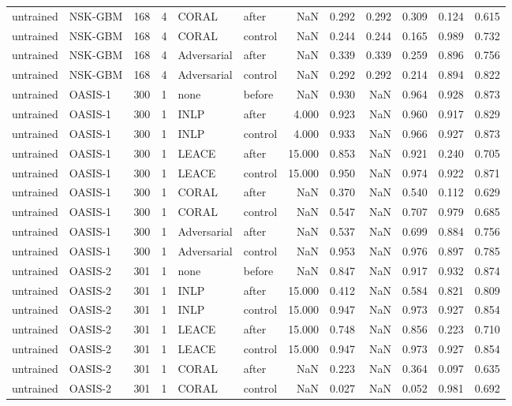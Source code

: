 \begin{tabular}{llrrllrrrrrr}
untrained & NSK-GBM & 168 & 4 & CORAL & after & NaN & 0.292 & 0.292 & 0.309 & 0.124 & 0.615 \\
untrained & NSK-GBM & 168 & 4 & CORAL & control & NaN & 0.244 & 0.244 & 0.165 & 0.989 & 0.732 \\
untrained & NSK-GBM & 168 & 4 & Adversarial & after & NaN & 0.339 & 0.339 & 0.259 & 0.896 & 0.756 \\
untrained & NSK-GBM & 168 & 4 & Adversarial & control & NaN & 0.292 & 0.292 & 0.214 & 0.894 & 0.822 \\
untrained & OASIS-1 & 300 & 1 & none & before & NaN & 0.930 & NaN & 0.964 & 0.928 & 0.873 \\
untrained & OASIS-1 & 300 & 1 & INLP & after & 4.000 & 0.923 & NaN & 0.960 & 0.917 & 0.829 \\
untrained & OASIS-1 & 300 & 1 & INLP & control & 4.000 & 0.933 & NaN & 0.966 & 0.927 & 0.873 \\
untrained & OASIS-1 & 300 & 1 & LEACE & after & 15.000 & 0.853 & NaN & 0.921 & 0.240 & 0.705 \\
untrained & OASIS-1 & 300 & 1 & LEACE & control & 15.000 & 0.950 & NaN & 0.974 & 0.922 & 0.871 \\
untrained & OASIS-1 & 300 & 1 & CORAL & after & NaN & 0.370 & NaN & 0.540 & 0.112 & 0.629 \\
untrained & OASIS-1 & 300 & 1 & CORAL & control & NaN & 0.547 & NaN & 0.707 & 0.979 & 0.685 \\
untrained & OASIS-1 & 300 & 1 & Adversarial & after & NaN & 0.537 & NaN & 0.699 & 0.884 & 0.756 \\
untrained & OASIS-1 & 300 & 1 & Adversarial & control & NaN & 0.953 & NaN & 0.976 & 0.897 & 0.785 \\
untrained & OASIS-2 & 301 & 1 & none & before & NaN & 0.847 & NaN & 0.917 & 0.932 & 0.874 \\
untrained & OASIS-2 & 301 & 1 & INLP & after & 15.000 & 0.412 & NaN & 0.584 & 0.821 & 0.809 \\
untrained & OASIS-2 & 301 & 1 & INLP & control & 15.000 & 0.947 & NaN & 0.973 & 0.927 & 0.854 \\
untrained & OASIS-2 & 301 & 1 & LEACE & after & 15.000 & 0.748 & NaN & 0.856 & 0.223 & 0.710 \\
untrained & OASIS-2 & 301 & 1 & LEACE & control & 15.000 & 0.947 & NaN & 0.973 & 0.927 & 0.854 \\
untrained & OASIS-2 & 301 & 1 & CORAL & after & NaN & 0.223 & NaN & 0.364 & 0.097 & 0.635 \\
untrained & OASIS-2 & 301 & 1 & CORAL & control & NaN & 0.027 & NaN & 0.052 & 0.981 & 0.692 \\

\end{tabular}
